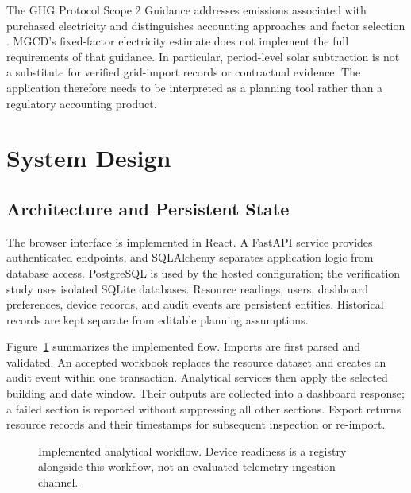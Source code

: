 \documentclass[conference]{IEEEtran}
\begin{document}
The GHG Protocol Scope 2 Guidance addresses emissions associated with purchased electricity and distinguishes accounting approaches and factor selection \cite{ghg}. MGCD's fixed-factor electricity estimate does not implement the full requirements of that guidance. In particular, period-level solar subtraction is not a substitute for verified grid-import records or contractual evidence. The application therefore needs to be interpreted as a planning tool rather than a regulatory accounting product.

\section{System Design}
\subsection{Architecture and Persistent State}
The browser interface is implemented in React. A FastAPI service provides authenticated endpoints, and SQLAlchemy separates application logic from database access. PostgreSQL is used by the hosted configuration; the verification study uses isolated SQLite databases. Resource readings, users, dashboard preferences, device records, and audit events are persistent entities. Historical records are kept separate from editable planning assumptions.

Figure~\ref{fig:architecture} summarizes the implemented flow. Imports are first parsed and validated. An accepted workbook replaces the resource dataset and creates an audit event within one transaction. Analytical services then apply the selected building and date window. Their outputs are collected into a dashboard response; a failed section is reported without suppressing all other sections. Export returns resource records and their timestamps for subsequent inspection or re-import.

\begin{figure}[t]
\centering
\setlength{\fboxsep}{6pt}
\caption{Implemented analytical workflow. Device readiness is a registry alongside this workflow, not an evaluated telemetry-ingestion channel.}
\label{fig:architecture}
\end{figure}
\end{document}
